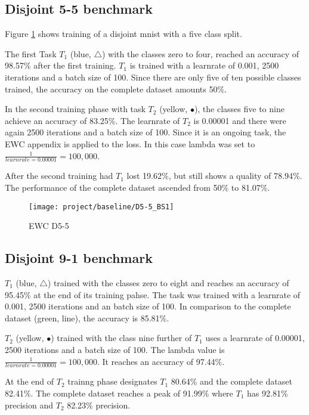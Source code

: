 \subsection{Disjoint 5-5 benchmark}

Figure \ref{fig:ewc_d5-5} shows training of a disjoint mnist with a five class split.

The first Task $T_1$ (blue, $\bigtriangleup$) with the classes zero to four, reached an accuracy of 98.57\% after the first training.
$T_1$ is trained with a learnrate of 0.001, 2500 iterations and a batch size of 100.
Since there are only five of ten possible classes trained, the accuracy on the complete dataset amounts 50\%.

In the second training phase with task $T_2$ (yellow, $\bullet$), the classes five to nine achieve an accuracy of 83.25\%.
The learnrate of $T_2$ is 0.00001 and there were again 2500 iterations and a batch size of 100.
Since it is an ongoing task, the EWC appendix is applied to the loss.
In this case lambda was set to $\frac{1}{learnrate = 0.00001} = 100,000$.

After the second training had $T_1$ lost 19.62\%, but still shows a quality of 78.94\%.
The performance of the complete dataset ascended from 50\% to 81.07\%.

\begin{figure}[H]
    \centering
    \texttt{[image: project/baseline/D5-5\_BS1]}
    \caption{EWC D5-5}
    \label{fig:ewc_d5-5}
\end{figure}

\subsection{Disjoint 9-1 benchmark}

$T_1$ (blue, $\bigtriangleup$) trained with the classes zero to eight and reaches an accuracy of 95.45\% at the end of its training pahse.
The task was trained with a learnrate of 0.001, 2500 iterations and an batch size of 100.
In comparison to the complete dataset (green, line), the accuracy is 85.81\%.

$T_2$ (yellow, $\bullet$) trained with the class nine further of $T_1$ uses a learnrate of 0.00001, 2500 iterations and a batch size of 100.
The lambda value is $\frac{1}{learnrate = 0.00001} = 100,000$.
It reaches an accuracy of 97.44\%.

At the end of $T_2$ trainng phase designates $T_1$ 80.64\% and the complete dataset 82.41\%.
The complete dataset reaches a peak of 91.99\% where $T_1$ has 92.81\% precision and $T_2$ 82.23\% precision.


